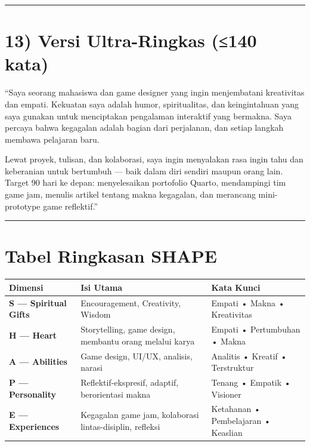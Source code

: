 \documentclass[
  letterpaper,
  DIV=11,
  numbers=noendperiod]{scrreprt}
\begin{document}
\begin{center}\rule{0.5\linewidth}{0.5pt}\end{center}

\section{13) Versi Ultra-Ringkas (≤140
kata)}\label{versi-ultra-ringkas-140-kata}

``Saya seorang mahasiswa dan game designer yang ingin menjembatani
kreativitas dan empati. Kekuatan saya adalah humor, spiritualitas, dan
keingintahuan yang saya gunakan untuk menciptakan pengalaman interaktif
yang bermakna. Saya percaya bahwa kegagalan adalah bagian dari
perjalanan, dan setiap langkah membawa pelajaran baru.

Lewat proyek, tulisan, dan kolaborasi, saya ingin menyalakan rasa ingin
tahu dan keberanian untuk bertumbuh --- baik dalam diri sendiri maupun
orang lain. Target 90 hari ke depan: menyelesaikan portofolio Quarto,
mendampingi tim game jam, menulis artikel tentang makna kegagalan, dan
merancang mini-prototype game reflektif.''

\begin{center}\rule{0.5\linewidth}{0.5pt}\end{center}

\section{Tabel Ringkasan SHAPE}\label{tabel-ringkasan-shape}

\begin{longtable}[]{@{}
  >{\raggedright\arraybackslash}p{}
  >{\raggedright\arraybackslash}p{}
  >{\raggedright\arraybackslash}p{}@{}}
\toprule\noalign{}
\begin{minipage}[b]{\linewidth}\raggedright
Dimensi
\end{minipage} & \begin{minipage}[b]{\linewidth}\raggedright
Isi Utama
\end{minipage} & \begin{minipage}[b]{\linewidth}\raggedright
Kata Kunci
\end{minipage} \\
\midrule\noalign{}
\endhead
\bottomrule\noalign{}
\endlastfoot
\textbf{S --- Spiritual Gifts} & Encouragement, Creativity, Wisdom &
Empati • Makna • Kreativitas \\
\textbf{H --- Heart} & Storytelling, game design, membantu orang melalui
karya & Empati • Pertumbuhan • Makna \\
\textbf{A --- Abilities} & Game design, UI/UX, analisis, narasi &
Analitis • Kreatif • Terstruktur \\
\textbf{P --- Personality} & Reflektif-ekspresif, adaptif, berorientasi
makna & Tenang • Empatik • Visioner \\
\textbf{E --- Experiences} & Kegagalan game jam, kolaborasi
lintas-disiplin, refleksi & Ketahanan • Pembelajaran • Keaslian \\
\end{longtable}
\end{document}

